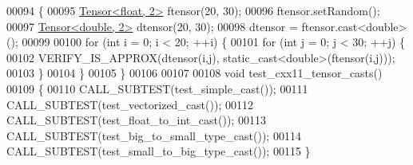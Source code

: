 \begin{DoxyCode}
00094 \{
00095   \hyperlink{class_eigen_1_1_tensor}{Tensor<float, 2>} ftensor(20, 30);
00096   ftensor.setRandom();
00097   \hyperlink{class_eigen_1_1_tensor}{Tensor<double, 2>} dtensor(20, 30);
00098   dtensor = ftensor.cast<\textcolor{keywordtype}{double}>();
00099 
00100   \textcolor{keywordflow}{for} (\textcolor{keywordtype}{int} i = 0; i < 20; ++i) \{
00101     \textcolor{keywordflow}{for} (\textcolor{keywordtype}{int} j = 0; j < 30; ++j) \{
00102       VERIFY\_IS\_APPROX(dtensor(i,j), static\_cast<double>(ftensor(i,j)));
00103     \}
00104   \}
00105 \}
00106 
00107 
00108 \textcolor{keywordtype}{void} test\_cxx11\_tensor\_casts()
00109 \{
00110    CALL\_SUBTEST(test\_simple\_cast());
00111    CALL\_SUBTEST(test\_vectorized\_cast());
00112    CALL\_SUBTEST(test\_float\_to\_int\_cast());
00113    CALL\_SUBTEST(test\_big\_to\_small\_type\_cast());
00114    CALL\_SUBTEST(test\_small\_to\_big\_type\_cast());
00115 \}
\end{DoxyCode}
